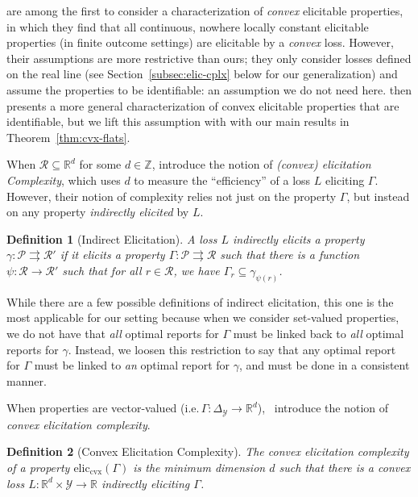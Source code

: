 \documentclass{article}
\newcommand{\reals}{\mathbb{R}}
\newcommand{\simplex}{\Delta_\Y}
\newcommand{\eliccvx}{\mathrm{elic}_\mathrm{cvx}}
\renewcommand{\P}{\mathcal{P}}
\newcommand{\R}{\mathcal{R}}
\newcommand{\Y}{\mathcal{Y}}
\newcommand{\toto}{\rightrightarrows}
\newtheorem{definition}{Definition}
\begin{document}
\cite{finocchiaro2018convex} are among the first to consider a characterization of \emph{convex} elicitable properties, in which they find that all continuous, nowhere locally constant elicitable properties (in finite outcome settings) are elicitable by a \emph{convex} loss.
However, their assumptions are more restrictive than ours; they only consider losses defined on the real line (see Section~\ref{subsec:elic-cplx} below for our generalization) and assume the properties to be identifiable: an assumption we do not need here.
\cite{frongillo2018elicitation} then presents a more general characterization of convex elicitable properties that are identifiable, but we lift this assumption with with our main results in Theorem~\ref{thm:cvx-flats}.

When $\R \subseteq \reals^d$ for some $d \in \mathbb{Z}$, \cite{frongillo2015elicitation} introduce the notion of \emph{(convex) elicitation Complexity}, which uses $d$ to measure the ``efficiency'' of a loss $L$ eliciting $\Gamma$.
However, their notion of complexity relies not just on the property $\Gamma$, but instead on any property \emph{indirectly elicited} by $L$.

\begin{definition}[Indirect Elicitation]\label{def:indirectly-elicits}
	A loss $L$ \emph{indirectly elicits} a property $\gamma:\P \toto \R'$ if it elicits a property $\Gamma: \P\toto \R$ such that there is a function $\psi:\R \to \R'$ such that for all $r \in \R$, we have $\Gamma_r \subseteq \gamma_{\psi(r)}$.
\end{definition}
While there are a few possible definitions of indirect elicitation, this one is the most applicable for our setting because when we consider set-valued properties, we do not have that \emph{all} optimal reports for $\Gamma$ must be linked back to \emph{all} optimal reports for $\gamma$.
Instead, we loosen this restriction to say that any optimal report for $\Gamma$ must be linked to \emph{an} optimal report for $\gamma$, and must be done in a consistent manner.

When properties are vector-valued (i.e.$\, \Gamma: \simplex \to \reals^d$),~\cite{frongillo2015elicitation} introduce the notion of \emph{convex elicitation complexity}.

\begin{definition}[Convex Elicitation Complexity]
	The \emph{convex elicitation complexity} of a property $\eliccvx(\Gamma)$ is the minimum dimension $d$ such that there is a convex loss $L : \reals^d \times \Y \to \reals$ indirectly eliciting $\Gamma$.
\end{definition}
\end{document}
